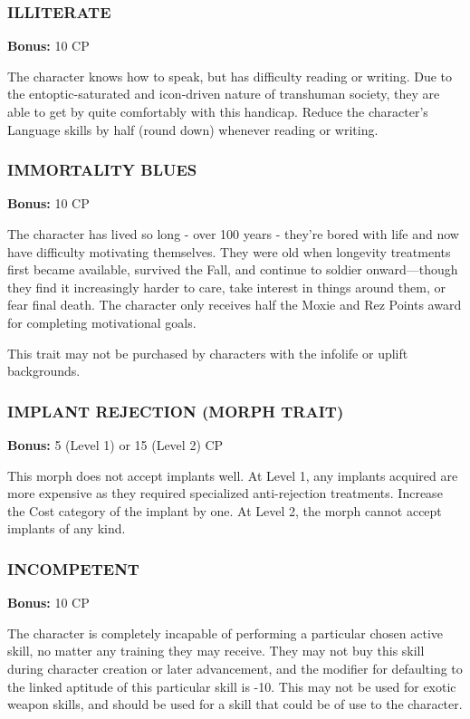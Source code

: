 \subsubsection{ILLITERATE}
\textbf{Bonus:} 10 CP

The character knows how to speak, but has difficulty reading or writing. Due
to the entoptic-saturated and icon-driven nature of transhuman society, they
are able to get by quite comfortably with this handicap.  Reduce the
character’s Language skills by half (round down) whenever reading or writing.

\subsubsection{IMMORTALITY BLUES}
\textbf{Bonus:} 10 CP

The character has lived so long - over 100 years - they’re bored with life and
now have difficulty motivating themselves. They were old when longevity
treatments first became available, survived the Fall, and continue to soldier
onward—though they find it increasingly harder to care, take interest in things
around them, or fear final death. The character only receives half the Moxie
and Rez Points award for completing motivational goals.

This trait may not be purchased by characters with the infolife or uplift
backgrounds.

\subsubsection{IMPLANT REJECTION (MORPH TRAIT)}
\textbf{Bonus:} 5 (Level 1) or 15 (Level 2) CP

This morph does not accept implants well. At Level 1, any implants acquired are
more expensive as they required specialized anti-rejection treatments. Increase
the Cost category of the implant by one. At Level 2, the morph cannot accept
implants of any kind.

\subsubsection{INCOMPETENT}
\textbf{Bonus:} 10 CP

The character is completely incapable of performing a particular chosen active
skill, no matter any training they may receive. They may not buy this skill
during character creation or later advancement, and the modifier for defaulting
to the linked aptitude of this particular skill is -10. This may not be used
for exotic weapon skills, and should be used for a skill that could be of use
to the character.

